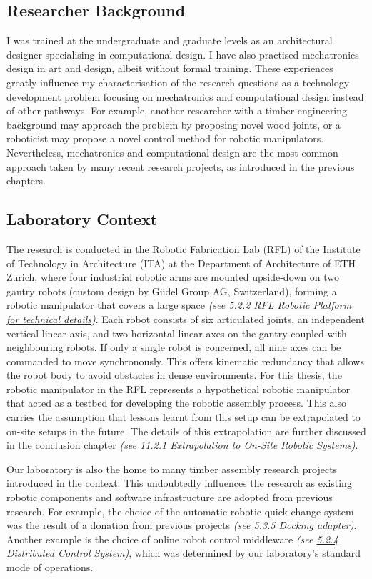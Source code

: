 \subsection{Researcher Background}

I was trained at the undergraduate and graduate levels as an architectural designer specialising in computational design. I have also practised mechatronics design in art and design, albeit without formal training. These experiences greatly influence my characterisation of the research questions as a technology development problem focusing on mechatronics and computational design instead of other pathways. For example, another researcher with a timber engineering background may approach the problem by proposing novel wood joints, or a roboticist may propose a novel control method for robotic manipulators. Nevertheless, mechatronics and computational design are the most common approach taken by many recent research projects, as introduced in the previous chapters.

\subsection{Laboratory Context}

The research is conducted in the Robotic Fabrication Lab (RFL) of the Institute of Technology in Architecture (ITA) at the Department of Architecture of ETH Zurich, where four industrial robotic arms are mounted upside-down on two gantry robots (custom design by Güdel Group AG, Switzerland), forming a robotic manipulator that covers a large space\textit{ (see \ul{5.2.2 RFL Robotic Platform for technical details})}. Each robot consists of six articulated joints, an independent vertical linear axis, and two horizontal linear axes on the gantry coupled with neighbouring robots. If only a single robot is concerned, all nine axes can be commanded to move synchronously. This offers kinematic redundancy that allows the robot body to avoid obstacles in dense environments. For this thesis, the robotic manipulator in the RFL represents a hypothetical robotic manipulator that acted as a testbed for developing the robotic assembly process. This also carries the assumption that lessons learnt from this setup can be extrapolated to on-site setups in the future. The details of this extrapolation are further discussed in the conclusion chapter \textit{(see \ul{11.2.1 Extrapolation to On-Site Robotic Systems})}. 

Our laboratory is also the home to many timber assembly research projects introduced in the context. This undoubtedly influences the research as existing robotic components and software infrastructure are adopted from previous research. For example, the choice of the automatic robotic quick-change system was the result of a donation from previous projects \textit{(see \ul{5.3.5 Docking adapter})}. Another example is the choice of online robot control middleware \textit{(see \ul{5.2.4 Distributed Control System})}, which was determined by our laboratory's standard mode of operations.

